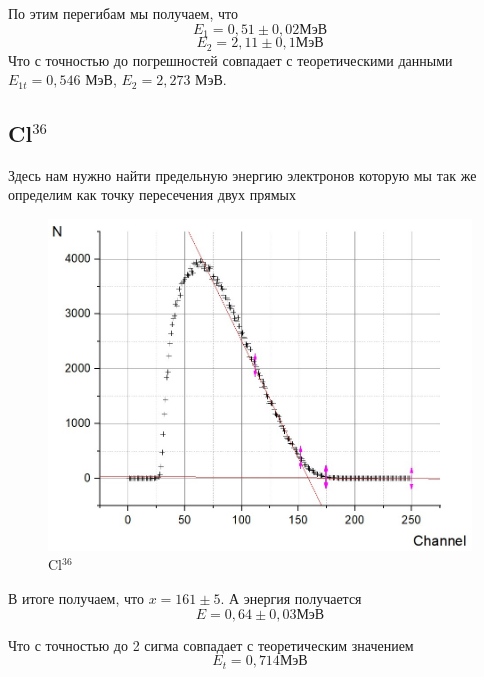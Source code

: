 \documentclass[a4paper, 12pt]{article}%
\begin{document}
По этим перегибам мы получаем, что \[E_1 = 0,51 \pm 0,02\text{МэВ}\] \[E_2 = 2,11 \pm 0,1\text{МэВ}\] Что с точностью до погрешностей совпадает с теоретическими данными $E_{1t} = 0,546$ МэВ, $E_2 = 2,273$ МэВ.
\newpage
\subsection*{Cl$^{36}$}
Здесь нам нужно найти предельную энергию электронов которую мы так же определим как точку пересечения двух прямых

\begin{figure}[h]
\begin{center}
\includegraphics[width = \textwidth]{12.jpg}
\caption{Cl$^{36}$}
\end{center}
\end{figure}

В итоге получаем, что $x = 161 \pm 5$. А энергия получается
\[E = 0,64 \pm 0,03 \text{МэВ}\]

Что с точностью до 2 сигма совпадает с теоретическим значением
\[E_t = 0,714 \text{МэВ}\]
\newpage
\end{document}
